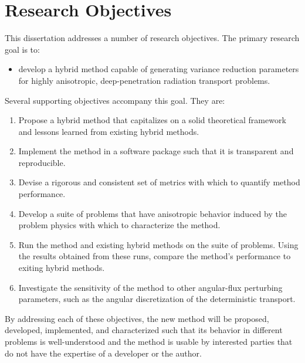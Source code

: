 \section{Research Objectives}
\label{sec:objectives}

This dissertation addresses a number of research objectives. The
primary research goal is to:
\begin{itemize}
  \item develop a hybrid method capable of generating variance reduction
    parameters for highly anisotropic, deep-penetration radiation transport problems.
\end{itemize}
Several supporting objectives accompany this goal. They are:
\begin{enumerate}
  \item Propose a hybrid method that capitalizes on a solid theoretical framework
    and lessons learned from existing hybrid methods.
  \item Implement the method in a software package such that it is transparent
    and reproducible.
  \item Devise a rigorous and consistent set of metrics with which to quantify
    method performance.
  \item Develop a suite of problems that have anisotropic behavior induced by
    the problem physics with which to characterize the method.
  \item Run the method and existing hybrid methods on the suite of problems.
    Using the results obtained from these runs, compare the method's
    performance to exiting hybrid methods.
  \item Investigate the sensitivity of the method to other angular-flux
    perturbing parameters, such as the angular discretization of the
    deterministic transport.
\end{enumerate}
By
addressing each of these objectives, the new method will be
proposed, developed, implemented, and characterized such that its behavior in
different problems is well-understood and the method is usable by interested
parties that do not have the expertise of a developer or the author.

